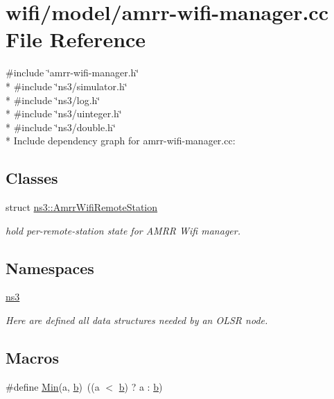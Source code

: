 \hypertarget{amrr-wifi-manager_8cc}{}\section{wifi/model/amrr-\/wifi-\/manager.cc File Reference}
\label{amrr-wifi-manager_8cc}
{\ttfamily \#include \char`\"{}amrr-\/wifi-\/manager.\+h\char`\"{}}\\*
{\ttfamily \#include \char`\"{}ns3/simulator.\+h\char`\"{}}\\*
{\ttfamily \#include \char`\"{}ns3/log.\+h\char`\"{}}\\*
{\ttfamily \#include \char`\"{}ns3/uinteger.\+h\char`\"{}}\\*
{\ttfamily \#include \char`\"{}ns3/double.\+h\char`\"{}}\\*
Include dependency graph for amrr-\/wifi-\/manager.cc\+:
\subsection*{Classes}
\begin{DoxyCompactItemize}
\item 
struct \hyperlink{structns3_1_1AmrrWifiRemoteStation}{ns3\+::\+Amrr\+Wifi\+Remote\+Station}
\begin{DoxyCompactList}\small\item\em hold per-\/remote-\/station state for A\+M\+RR Wifi manager. \end{DoxyCompactList}\end{DoxyCompactItemize}
\subsection*{Namespaces}
\begin{DoxyCompactItemize}
\item 
 \hyperlink{namespacens3}{ns3}
\begin{DoxyCompactList}\small\item\em Here are defined all data structures needed by an O\+L\+SR node. \end{DoxyCompactList}\end{DoxyCompactItemize}
\subsection*{Macros}
\begin{DoxyCompactItemize}
\item 
\#define \hyperlink{amrr-wifi-manager_8cc_a9e04209162ea72f9985338596262b657}{Min}(a,  \hyperlink{lte__pathloss_8m_a21ad0bd836b90d08f4cf640b4c298e7c}{b})~((a $<$ \hyperlink{lte__pathloss_8m_a21ad0bd836b90d08f4cf640b4c298e7c}{b}) ? a \+: \hyperlink{lte__pathloss_8m_a21ad0bd836b90d08f4cf640b4c298e7c}{b})
\end{DoxyCompactItemize}

